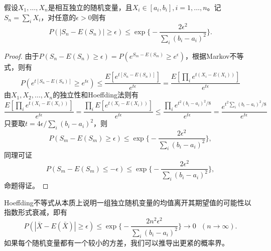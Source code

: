 \begin{theorem}[Hoeffding不等式]
假设$X_1,\ldots, X_n$是相互独立的随机变量，且$X_i\in[a_i,b_i], i =1,\ldots,n$。记$S_n=\sum\limits_i X_i$，对任意的$\epsilon>0$则有
\begin{equation}
    P(|S_n-E(S_n)| \ge \epsilon) \le \exp\bigg\{-\frac{2\epsilon^2}{\sum\limits_i (b_i-a_i)^2}\bigg\}.
\end{equation}

\begin{proof}
由于$P(S_n-E(S_n) \ge \epsilon) = P(e^{S_m-E(S_m)} \ge e^\epsilon)$，根据Markov不等式，则有
\begin{equation}
    P(e^{t[S_n-E(S_n)]} \ge e^{t\epsilon}) \le \frac{E[e^{t
    [S_n-E(S_n)]}]}{e^{t\epsilon}} = \frac{E[\prod\limits_i e^{t(X_i-E(X_i))}]}{e^{t\epsilon}}
\end{equation}
由$X_1,X_2,\ldots, X_n$的独立性和Hoeffding法则有
\begin{equation}
  \frac{E[\prod\limits_i e^{t(X_i-E(X_i))}]}{e^{t\epsilon}} = \frac{\prod\limits_i E[e^{t(X_i-E(X_i))}]}{e^{t\epsilon}} \le \frac{\prod\limits_i e^{t^2(b_i-a_i)^2/8}}{e^{t\epsilon}} = \frac{e^{t^2 \sum\limits_i (b_i-a_i)^2/8}}{e^{t\epsilon}}
\end{equation}
只要取$t = 4\epsilon/\sum\limits_i (b_i-a_i)^2$，则
\begin{equation}
    P(S_m-E(S_m) \ge \epsilon) \le \exp\bigg\{-\frac{2\epsilon^2}{\sum\limits_i (b_i-a_i)^2}\bigg\},
\end{equation}
同理可证
\begin{equation}
    P(S_m-E(S_m) \le -\epsilon) \le \exp\bigg\{-\frac{2\epsilon^2}{\sum\limits_i (b_i-a_i)^2}\bigg\},
\end{equation}
命题得证。
\end{proof}
\end{theorem}
Hoeffding不等式从本质上说明一组独立随机变量的均值离开其期望值的可能性以指数形式衰减，即有
\[
    P(|\bar X - E (\bar X)| \ge \epsilon) \le \exp\bigg\{-\frac{2 n^2 \epsilon^2}{\sum\limits_i (b_i-a_i)^2}\bigg\}\rightarrow 0~~~(n\rightarrow \infty).
\]
如果每个随机变量都有一个较小的方差，我们可以推导出更紧的概率界。

